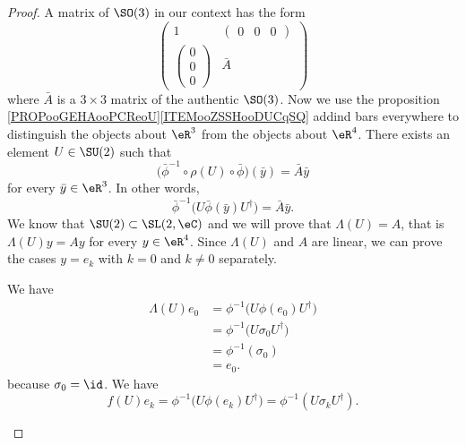 \begin{proof}
	A matrix of \( \SO(3)\) in our context has the form
	\begin{equation}
		\begin{pmatrix}
			1               & \begin{pmatrix}
				                  0 & 0 & 0
			                  \end{pmatrix} \\
			\begin{pmatrix}
				0 \\
				0 \\
				0
			\end{pmatrix} & \bar A
		\end{pmatrix}
	\end{equation}
	where \( \bar A\) is a \( 3\times 3\) matrix of the authentic \( \SO(3)\). Now we use the proposition \ref{PROPooGEHAooPCReoU}\ref{ITEMooZSSHooDUCqSQ} addind bars everywhere to distinguish the objects about \( \eR^3\) from the objects about \( \eR^4\). There exists an element \( U\in \SU(2)\) such that
	\begin{equation}
		\big( \bar\phi^{-1}\circ\rho(U)\circ\bar \phi \big)(\bar y)=\bar A\bar y
	\end{equation}
	for every \( \bar y\in \eR^3\). In other words,
	\begin{equation}
		\bar\phi^{-1}\big( U\bar\phi(\bar y)U^{\dag} \big)=\bar A\bar y.
	\end{equation}
	We know that \( \SU(2)\subset \SL(2,\eC)\) and we will prove that \( \Lambda(U)=A\), that is \( \Lambda(U)y=Ay\) for every \( y\in \eR^4\). Since \( \Lambda(U)\) and \( A\) are linear, we can prove the cases \( y=e_k\) with \( k=0\) and \( k\neq 0\) separately.
	\begin{subproof}
		\spitem[$ y=e_0$]
		We have
		\begin{subequations}
			\begin{align}
				\Lambda(U)e_0 & =\phi^{-1}\big( U\phi(e_0) U^{\dag}\big) \\
				              & =\phi^{-1}\big( U\sigma_0U^{\dag} \big)  \\
				              & =\phi^{-1}(\sigma_0)                     \\
				              & =e_0.
			\end{align}
		\end{subequations}
		because \( \sigma_0=\id\).
		\spitem[$ y=e_k$ with $ k\neq 0$]
		We have
		\begin{equation}
			f(U)e_k=\phi^{-1}\big( U\phi(e_k)U^{\dag} \big)=\phi^{-1}(U\sigma_k U^{\dag}).

\end{equation}
\end{subproof}
\end{proof}
